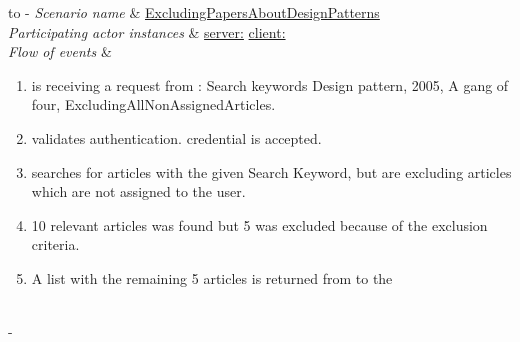 %
%
\begin{table}[h!]
	\tabulinesep=1.5mm
	\begin{tabu} to 
		\tabucline[1.5pt]-
		\textit{Scenario name} & \underline{ExcludingPapersAboutDesignPatterns} \\
		\hline
		\textit{Participating actor \newline instances} & \underline{server:\serverside}
		\newline \underline{client:\clientside} \\
		\hline
		\textit{Flow of events} &
		\vspace{-3mm}
		\begin{enumerate}[leftmargin=*,topsep=0pt,itemsep=-1ex]
			\item \serverside is receiving a request from \clientside: Search keywords {Design pattern, 2005, A gang of four}, Excluding{AllNonAssignedArticles}.
			
			\item \serverside validates \user authentication. \user credential is accepted.
			
			\item \serverside searches for articles with the given Search Keyword, but are excluding articles which are not assigned to the user.
			
			\item 10 relevant articles was found but 5 was excluded because of the exclusion criteria.
			
			\item A list with the remaining 5 articles is returned from \serverside to the \clientside\\				
		\end{enumerate} \\
		\tabucline[1.5pt]-
	\end{tabu}
	\caption{Scenario when a user wants to exclude some papers.}
	\label{sc:ExcludingPapersAboutDesignPatterns}
\end{table}


